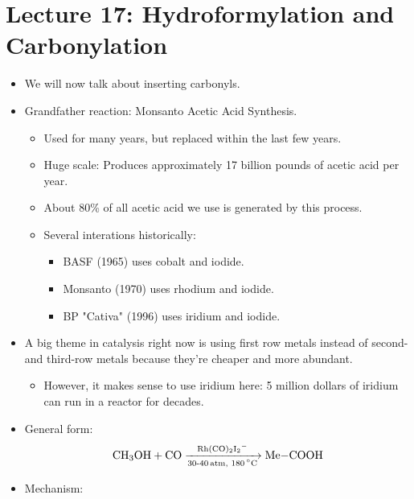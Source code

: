 \documentclass[../notes.tex]{subfiles}
\begin{document}
\section{Lecture 17: Hydroformylation and Carbonylation}
\begin{itemize}
    \item {}We will now talk about inserting carbonyls.
    \item Grandfather reaction: Monsanto Acetic Acid Synthesis.
    \begin{itemize}
        \item Used for many years, but replaced within the last few years.
        \item Huge scale: Produces approximately 17 billion pounds of acetic acid per year.
        \item About 80\% of all acetic acid we use is generated by this process.
        \item Several interations historically:
        \begin{itemize}
            \item BASF (1965) uses cobalt and iodide.
            \item Monsanto (1970) uses rhodium and iodide.
            \item BP "Cativa" (1996) uses iridium and iodide.
        \end{itemize}
    \end{itemize}
    \item A big theme in catalysis right now is using first row metals instead of second- and third-row metals because they're cheaper and more abundant.
    \begin{itemize}
        \item However, it makes sense to use iridium here: 5 million dollars of iridium can run in a reactor for decades.
    \end{itemize}
    \item General form:
    \begin{equation*}
        \ce{CH3OH + CO ->[Rh(CO)2I2-][{30-$\SI{40}{atm}$, $\SI{180}{\celsius}$}] Me-COOH}
    \end{equation*}
    \item Mechanism:
    \begin{figure}[h!]
        \centering
\end{figure}
\end{itemize}
\end{document}
